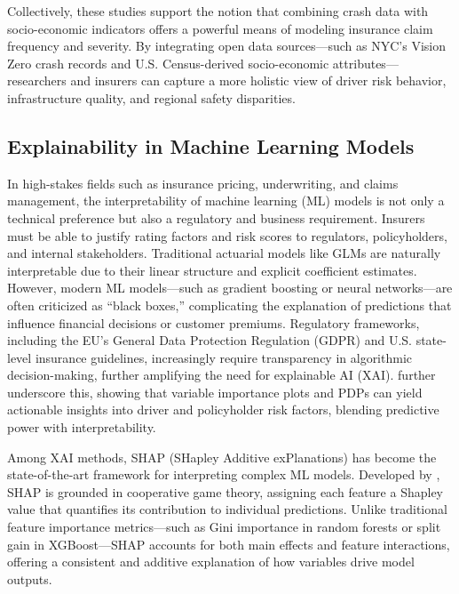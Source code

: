 \documentclass[
  number,
  review,
  3p]{elsarticle}
\begin{document}
Collectively, these studies support the notion that combining crash data
with socio-economic indicators offers a powerful means of modeling
insurance claim frequency and severity. By integrating open data
sources---such as NYC's Vision Zero crash records and U.S.
Census-derived socio-economic attributes---researchers and insurers can
capture a more holistic view of driver risk behavior, infrastructure
quality, and regional safety disparities.

\subsection{\texorpdfstring{\textbf{Explainability in Machine Learning
Models}}{Explainability in Machine Learning Models}}\label{explainability-in-machine-learning-models}

In high-stakes fields such as insurance pricing, underwriting, and
claims management, the interpretability of machine learning (ML) models
is not only a technical preference but also a regulatory and business
requirement. Insurers must be able to justify rating factors and risk
scores to regulators, policyholders, and internal stakeholders.
Traditional actuarial models like GLMs are naturally interpretable due
to their linear structure and explicit coefficient estimates. However,
modern ML models---such as gradient boosting or neural networks---are
often criticized as ``black boxes,'' complicating the explanation of
predictions that influence financial decisions or customer premiums.
Regulatory frameworks, including the EU's General Data Protection
Regulation (GDPR) and U.S. state-level insurance guidelines,
increasingly require transparency in algorithmic decision-making,
further amplifying the need for explainable AI (XAI). \citet{henckaerts}
further underscore this, showing that variable importance plots and PDPs
can yield actionable insights into driver and policyholder risk factors,
blending predictive power with interpretability.

Among XAI methods, SHAP (SHapley Additive exPlanations) has become the
state-of-the-art framework for interpreting complex ML models. Developed
by \citet{lundberg}, SHAP is grounded in cooperative game theory,
assigning each feature a Shapley value that quantifies its contribution
to individual predictions. Unlike traditional feature importance
metrics---such as Gini importance in random forests or split gain in
XGBoost---SHAP accounts for both main effects and feature interactions,
offering a consistent and additive explanation of how variables drive
model outputs.
\end{document}
